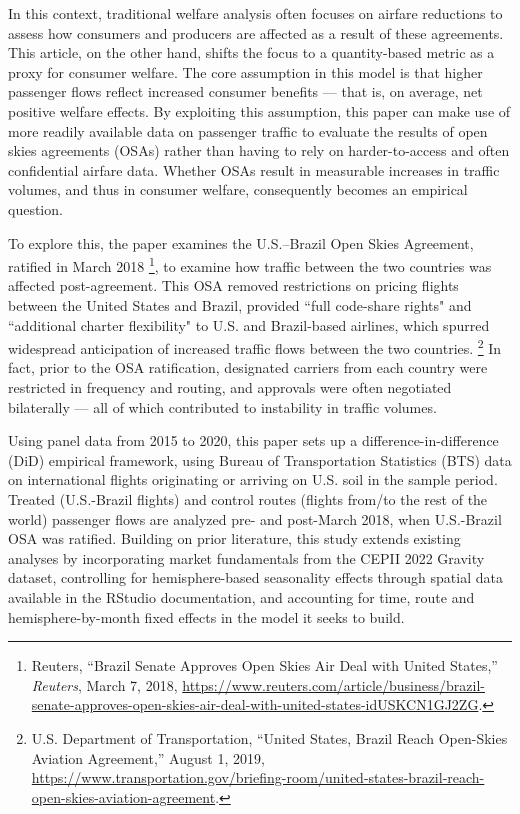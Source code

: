\documentclass[12pt]{article}
\begin{document}
In this context, traditional welfare analysis often focuses on airfare reductions to assess how consumers and producers are affected as a result of these agreements. This article, on the other hand, shifts the focus to a quantity-based metric as a proxy for consumer welfare. The core assumption in this model is that higher passenger flows reflect increased consumer benefits --- that is, on average, net positive welfare effects. By exploiting this assumption, this paper can make use of more readily available data on passenger traffic to evaluate the results of open skies agreements (OSAs) rather than having to rely on harder-to-access and often confidential airfare data. Whether OSAs result in measurable increases in traffic volumes, and thus in consumer welfare, consequently becomes an empirical question.

To explore this, the paper examines the U.S.–Brazil Open Skies Agreement, ratified in March 2018 \footnote{Reuters, “Brazil Senate Approves Open Skies Air Deal with United States,” \textit{Reuters}, March 7, 2018, \url{https://www.reuters.com/article/business/brazil-senate-approves-open-skies-air-deal-with-united-states-idUSKCN1GJ2ZG}.}, to examine how traffic between the two countries was affected post-agreement. This OSA removed restrictions on pricing flights between the United States and Brazil, provided ``full code-share rights" and ``additional charter flexibility" to U.S. and Brazil-based airlines, which spurred widespread anticipation of increased traffic flows between the two countries. \footnote{U.S. Department of Transportation, “United States, Brazil Reach Open-Skies Aviation Agreement,” August 1, 2019, \url{https://www.transportation.gov/briefing-room/united-states-brazil-reach-open-skies-aviation-agreement}.} In fact, prior to the OSA ratification, designated carriers from each country were restricted in frequency and routing, and approvals were often negotiated bilaterally --- all of which contributed to instability in traffic volumes.

Using panel data from 2015 to 2020, this paper sets up a difference-in-difference (DiD) empirical framework, using Bureau of Transportation Statistics (BTS) data on international flights originating or arriving on U.S. soil in the sample period. Treated (U.S.-Brazil flights) and control routes (flights from/to the rest of the world) passenger flows are analyzed pre- and post-March 2018, when U.S.-Brazil OSA was ratified. Building on prior literature, this study extends existing analyses by incorporating market fundamentals from the CEPII 2022 Gravity dataset, controlling for hemisphere-based seasonality effects through spatial data available in the RStudio documentation, and accounting for time, route and hemisphere-by-month fixed effects in the model it seeks to build.
\end{document}
